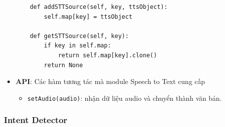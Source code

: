 \begin{itemize}
\begin{lstlisting}
    def addSTTSource(self, key, ttsObject):
        self.map[key] = ttsObject

    def getSTTSource(self, key):
        if key in self.map:
            return self.map[key].clone()
        return None
\end{lstlisting}

\item \textbf{API}: Các hàm tương tác mà module Speech to Text cung cấp
\begin{itemize}
\item \lstinline{setAudio(audio)}: nhận dữ liệu audio và chuyển thành văn bản.
\end{itemize}
\end{itemize}

\subsubsection{Intent Detector}
